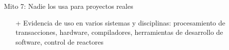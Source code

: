 \documentclass{beamer}
\begin{document}
\begin{frame}{Mito 7: Nadie los usa para proyectos reales}
\begin{itemize}[<+->]
\item[+] Evidencia de uso en varios sistemas y disciplinas: procesamiento de transacciones, hardware, compiladores, herramientas de desarrollo de software, control de reactores
\end{itemize}
\end{frame}
\end{document}
